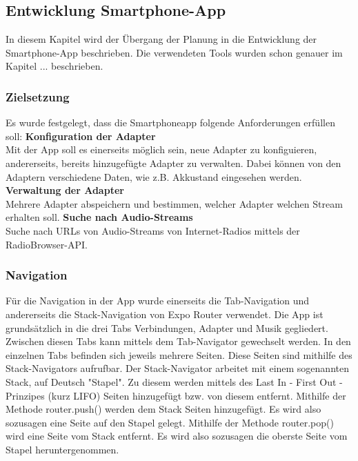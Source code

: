 \documentclass[]{article}
\begin{document}
\subsection{Entwicklung Smartphone-App}
In diesem Kapitel wird der Übergang der Planung in die Entwicklung der Smartphone-App beschrieben. Die verwendeten Tools wurden schon genauer im Kapitel ... beschrieben.
\subsubsection{Zielsetzung}
Es wurde festgelegt, dass die Smartphoneapp folgende Anforderungen erfüllen soll:
\vspace{4mm}\newline 
\textbf{Konfiguration der Adapter}  \\
Mit der App soll es einerseits möglich sein, neue Adapter zu konfiguieren, andererseits, bereits hinzugefügte Adapter zu verwalten. Dabei können von den Adaptern verschiedene Daten, wie z.B. Akkustand eingesehen werden.
\vspace{4mm}\newline
\textbf{Verwaltung der Adapter} \\
Mehrere Adapter abspeichern und bestimmen, welcher Adapter welchen Stream erhalten soll.
\vspace{4mm}\newline
\textbf{Suche nach Audio-Streams} \\
Suche nach URLs von Audio-Streams von Internet-Radios mittels der RadioBrowser-API.
\subsubsection{Navigation}
Für die Navigation in der App wurde einerseits die Tab-Navigation und andererseits die Stack-Navigation von Expo Router verwendet. Die App ist grundsätzlich in die drei Tabs Verbindungen, Adapter und Musik gegliedert. Zwischen diesen Tabs kann mittels dem Tab-Navigator gewechselt werden. In den einzelnen Tabs befinden sich jeweils mehrere Seiten. Diese Seiten sind mithilfe des Stack-Navigators aufrufbar. Der Stack-Navigator arbeitet mit einem sogenannten Stack, auf Deutsch "Stapel". Zu diesem werden mittels des Last In - First Out - Prinzipes (kurz LIFO) Seiten hinzugefügt bzw. von diesem entfernt. Mithilfe der Methode router.push() werden dem Stack Seiten hinzugefügt. Es wird also sozusagen eine Seite auf den Stapel gelegt. Mithilfe der Methode router.pop() wird eine Seite vom Stack entfernt. Es wird also sozusagen die oberste Seite vom Stapel heruntergenommen.
\end{document}
